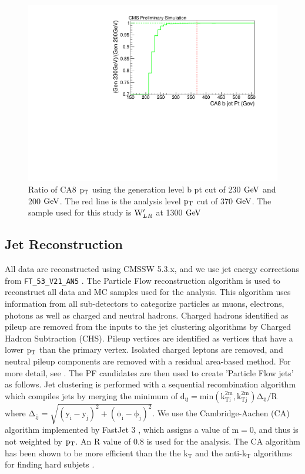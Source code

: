 \begin{figure}[Htcb]
\centering
\includegraphics[width=1.0\textwidth]{AN-13-004/figs/bjetptcut.pdf}
\caption{Ratio of CA8 $\mathrm{p_{T}}$ using the generation level b pt cut of 230$~\mathrm{GeV}$ and 200$~\mathrm{GeV}$.  The red line is the analysis level $\mathrm{p_{T}}$ cut of 370$~\mathrm{GeV}$.  The sample used for this study is $\mathrm{W}^\prime_{LR}$ at 1300$~\mathrm{GeV}$}
\label{figs:genptcut}
\end{figure}



\subsection{Jet Reconstruction}
\label{sec:reconstruction}
All data are reconstructed using CMSSW 5.3.x, and we use jet energy corrections from \verb!FT_53_V21_AN5! \cite{CMS-DP-2013-033}.  The Particle Flow reconstruction algorithm is used 
to reconstruct all data and MC samples used for the analysis.  This algorithm uses information from all sub-detectors 
to categorize particles as muons, electrons, photons as well as charged and 
neutral hadrons.  Charged hadrons identified as pileup are removed from the inputs to the jet clustering algorithms by Charged Hadron Subtraction (CHS).
Pileup vertices are identified as vertices that have a lower $\mathrm{p_{T}}$ than the primary vertex.  Isolated charged leptons are removed,
and neutral pileup components are removed with a residual area-based method.  For more detail, see \cite{7tevZprime}.  
The PF candidates are then used to create 'Particle Flow jets' as follows.  Jet clustering is performed 
with a sequential recombination algorithm which compiles jets by merging the minimum of 
$\mathrm{d_{ij} = min(k_{Ti}^{2m},k_{Tj}^{2m})\Delta _{ij}/R}$ where $\mathrm{\Delta _{ij} = \sqrt{(y_i-y_j)^2 + (\phi _i-\phi _j)^2}}$.
  We use the Cambridge-Aachen (CA) \cite{CAcambridge,CAaachen} algorithm implemented by FastJet 3 \cite{fastjet1,fastjet2}, 
which assigns a value of $\mathrm{m = 0}$, and thus is not weighted by $\mathrm{p_{T}}$.  An R value 
of 0.8 is used for the analysis.  The CA algorithm has been shown to be more efficient than the 
the $\mathrm{k_{T}}$ and the anti-$\mathrm{k_{T}}$ algorithms for finding hard subjets \cite{catop_cms}.


